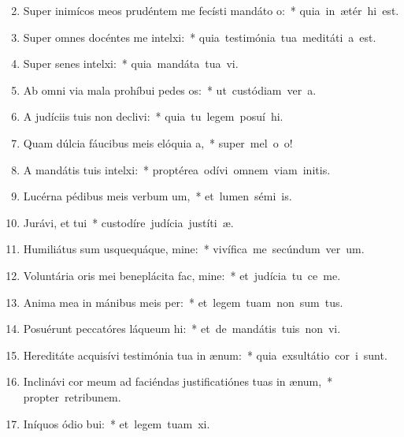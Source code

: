 \begin{flushleft}
\begin{enumerate}[leftmargin=*]
\setcounter{enumi}{1}

\item Super inimícos meos prudéntem me fecísti mandáto o:~* \mbox{quia in ætér hi est.}
\item Super omnes docéntes me intelxi:~* \mbox{quia testimónia tua meditáti a est.}
\item Super senes intelxi:~* \mbox{quia mandáta tua vi.}
\item Ab omni via mala prohíbui pedes os:~* \mbox{ut custódiam ver a.}
\item A judíciis tuis non declivi:~* \mbox{quia tu legem posuí hi.}
\item Quam dúlcia fáucibus meis elóquia a,~* \mbox{super mel o o!}
\item A mandátis tuis intelxi:~* \mbox{proptérea odívi omnem viam initis.}
\item Lucérna pédibus meis verbum um,~* \mbox{et lumen sémi is.}
\item Jurávi, et tui~* \mbox{custodíre judícia justíti æ.}
\item Humiliátus sum usquequáque, mine:~* \mbox{vivífica me secúndum ver um.}
\item Voluntária oris mei beneplácita fac, mine:~* \mbox{et judícia tu ce me.}
\item Anima mea in mánibus meis per:~* \mbox{et legem tuam non sum tus.}
\item Posuérunt peccatóres láqueum hi:~* \mbox{et de mandátis tuis non vi.}
\item Hereditáte acquisívi testimónia tua in ænum:~* \mbox{quia exsultátio cor i sunt.}
\item Inclinávi cor meum ad faciéndas justificatiónes tuas in ænum,~* \mbox{propter retribunem.}
\item Iníquos ódio bui:~* \mbox{et legem tuam xi.}

\end{enumerate}
\end{flushleft}
